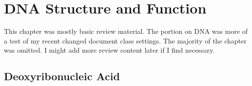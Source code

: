\documentclass{inVerba-notes}
\begin{document}
\tableofcontents

\chapter{DNA Structure and Function}\label{DNA Structure and Function}
\begin{adjustwidth}{1cm}{1cm}
  This chapter was mostly basic review material. The portion on DNA was more of a test of my recent changed document class settings. The majority of the chapter was omitted. I might add more review content later if I find necessary.
\end{adjustwidth}

\section{Deoxyribonucleic Acid}\label{Deoxyribonucleic Acid}
\end{document}
